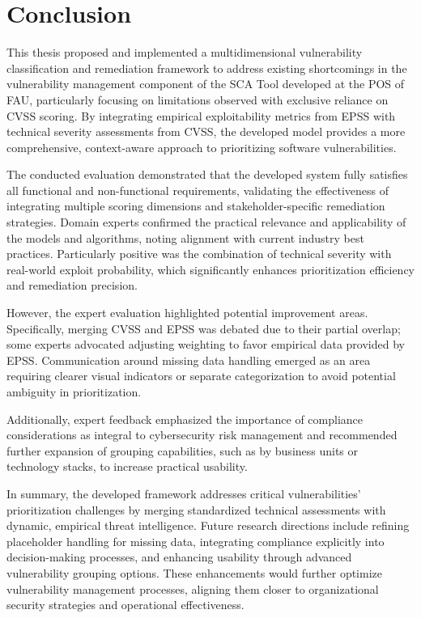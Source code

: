 \chapter{Conclusion}
\label{chapter:conclusion}

This thesis proposed and implemented a multidimensional vulnerability classification and remediation framework to address existing shortcomings in the vulnerability management component of the \ac{SCA} Tool developed at the \ac{POS} of \ac{FAU}, particularly focusing on limitations observed with exclusive reliance on \ac{CVSS} scoring. By integrating empirical exploitability metrics from \ac{EPSS} with technical severity assessments from \ac{CVSS}, the developed model provides a more comprehensive, context-aware approach to prioritizing software vulnerabilities.

The conducted evaluation demonstrated that the developed system fully satisfies all functional and non-functional requirements, validating the effectiveness of integrating multiple scoring dimensions and stakeholder-specific remediation strategies. Domain experts confirmed the practical relevance and applicability of the models and algorithms, noting alignment with current industry best practices. Particularly positive was the combination of technical severity with real-world exploit probability, which significantly enhances prioritization efficiency and remediation precision.

However, the expert evaluation highlighted potential improvement areas. Specifically, merging \ac{CVSS} and \ac{EPSS} was debated due to their partial overlap; some experts advocated adjusting weighting to favor empirical data provided by \ac{EPSS}. Communication around missing data handling emerged as an area requiring clearer visual indicators or separate categorization to avoid potential ambiguity in prioritization.

Additionally, expert feedback emphasized the importance of compliance considerations as integral to cybersecurity risk management and recommended further expansion of grouping capabilities, such as by business units or technology stacks, to increase practical usability.

In summary, the developed framework addresses critical vulnerabilities' prioritization challenges by merging standardized technical assessments with dynamic, empirical threat intelligence. Future research directions include refining placeholder handling for missing data, integrating compliance explicitly into decision-making processes, and enhancing usability through advanced vulnerability grouping options. These enhancements would further optimize vulnerability management processes, aligning them closer to organizational security strategies and operational effectiveness.